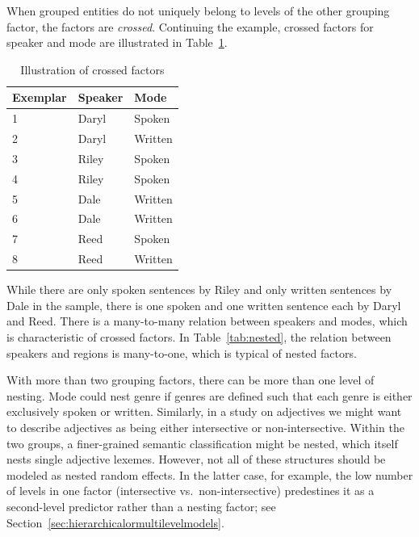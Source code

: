 When grouped entities do not uniquely belong to levels of the other grouping factor, the factors are \textit{crossed}.
Continuing the example, crossed factors for speaker and mode are illustrated in Table~\ref{tab:crossed}.
%
\begin{table}
  \centering
  \begin{tabular}{lll}
    \toprule
    \textbf{Exemplar} & \textbf{Speaker}  & \textbf{Mode}   \\
    \midrule
                    1 &           Daryl  &         Spoken  \\
                    2 &           Daryl  &         Written \\
                    3 &           Riley  &         Spoken  \\
                    4 &           Riley  &         Spoken  \\
                    5 &           Dale   &         Written \\
                    6 &           Dale   &         Written \\
                    7 &           Reed   &         Spoken  \\
                    8 &           Reed   &         Written \\
    \bottomrule
  \end{tabular}
  \caption{Illustration of crossed factors}
  \label{tab:crossed}
\end{table}
%
While there are only spoken sentences by Riley and only written sentences by Dale in the sample, there is one spoken and one written sentence each by Daryl and Reed.
There is a many-to-many relation between speakers and modes, which is characteristic of crossed factors.
In Table~\ref{tab:nested}, the relation between speakers and regions is many-to-one, which is typical of nested factors.

With more than two grouping factors, there can be more than one level of nesting.
Mode could nest genre if genres are defined such that each genre is either exclusively spoken or written.
Similarly, in a study on adjectives we might want to describe adjectives as being either intersective or non-intersective.
Within the two groups, a finer-grained semantic classification might be nested, which itself nests single adjective lexemes.
However, not all of these structures should be modeled as nested random effects.
In the latter case, for example, the low number of levels in one factor (intersective vs.\ non-intersective) predestines it as a second-level predictor rather than a nesting factor; see Section~\ref{sec:hierarchicalormultilevelmodels}.

